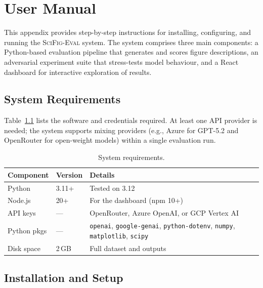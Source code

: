 \chapter{User Manual}
\label{app:user-manual}

\small
This appendix provides step-by-step instructions for installing, configuring, and running the \textsc{SciFig-Eval} system. The system comprises three main components: a Python-based evaluation pipeline that generates and scores figure descriptions, an adversarial experiment suite that stress-tests model behaviour, and a React dashboard for interactive exploration of results.

\section{System Requirements}

Table~\ref{tab:sys-req} lists the software and credentials required. At least one API provider is needed; the system supports mixing providers (e.g., Azure for GPT-5.2 and OpenRouter for open-weight models) within a single evaluation run.

\begin{table}[H]
\centering
\scriptsize
\caption{System requirements.}\label{tab:sys-req}
\begin{tabular}{@{}l l p{6cm}@{}}
\toprule
\textbf{Component} & \textbf{Version} & \textbf{Details} \\
\midrule
Python       & 3.11+  & Tested on 3.12 \\
Node.js      & 20+    & For the dashboard (npm 10+) \\
API keys     & ---    & OpenRouter, Azure OpenAI, or GCP Vertex AI \\
Python pkgs  & ---    & \texttt{openai}, \texttt{google-genai}, \texttt{python-dotenv}, \texttt{numpy}, \texttt{matplotlib}, \texttt{scipy} \\
Disk space   & 2\,GB  & Full dataset and outputs \\
\bottomrule
\end{tabular}
\end{table}

\section{Installation and Setup}

